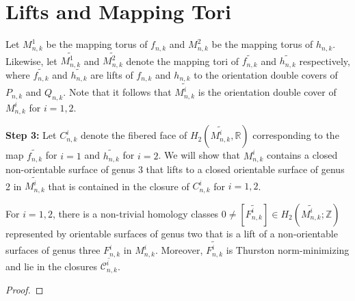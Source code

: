 \section{Lifts and Mapping Tori}

Let $M^1_{n,k}$ be the mapping torus of $f_{n,k}$ and $M^2_{n,k}$ be the mapping torus of $h_{n,k}$. Likewise, let $\widetilde{M^1_{n,k}}$ and $\widetilde{M^2_{n,k}}$ denote the mapping tori of $\widetilde{f_{n,k}}$ and $\widetilde{h_{n,k}}$ respectively, where $\widetilde{f_{n,k}}$ and $\widetilde{h_{n,k}}$ are lifts of $f_{n,k}$ and $h_{n,k}$ to the orientation double covers of $P_{n,k}$ and $Q_{n,k}$. Note that it follows that $\widetilde{M^i_{n,k}}$ is the orientation double cover of $M^i_{n,k}$ for $i = 1,2$. 

\textbf{Step 3:} Let $C^i_{n,k}$ denote the fibered face of $H_2(\widetilde{M^i_{n,k}},\mathbb{R})$ corresponding to the map $\widetilde{f_{n,k}}$ for $i = 1$ and $\widetilde{h_{n,k}}$ for $i = 2$. We will show that $M^i_{n,k}$ contains a closed non-orientable surface of genus 3 that lifts to a closed orientable surface of genus 2 in $\widetilde{M^i_{n,k}}$ that is contained in the closure of $C^i_{n,k}$ for $i = 1,2$.

\begin{lem}
For $i = 1,2$, there is a non-trivial homology classes $0 \neq [\widetilde{F^i_{n,k}}] \in H_2(\widetilde{M^i_{n,k}};\mathbb{Z})$ represented by orientable surfaces of genus two that is a lift of a non-orientable surfaces of genus three $F^i_{n,k}$ in $M^i_{n,k}$. Moreover, $\widetilde{F^i_{n,k}}$ is Thurston norm-minimizing and lie in the closures $\overline{\mathcal{C}^i_{n,k}}$.
\end{lem}
\begin{proof}

\end{proof}

